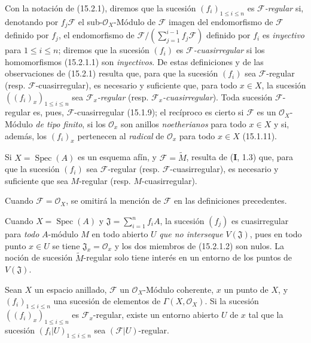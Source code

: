 \begin{env}[15.2.2]
\label{0.15.2.2-es}
Con la notación de (15.2.1), diremos que la sucesión
$(f_i)_{1\leq i\leq n}$ es \emph{$\mathscr{F}$-regular} si, denotando por
$f_j\mathscr{F}$ el sub-$\mathcal{O}_X$-Módulo de $\mathscr{F}$ imagen del
endomorfismo de $\mathscr{F}$ definido por $f_j$, el endomorfismo de
$\mathscr{F}/(\sum_{j=1}^{i-1}f_j\mathscr{F})$ definido por $f_i$ es \emph{inyectivo}
para $1\leq i\leq n$; diremos que la sucesión $(f_i)$ es
\emph{$\mathscr{F}$-cuasirregular} si los homomorfismos (15.2.1.1) son \emph{inyectivos}.
De estas definiciones y de las observaciones de (15.2.1) resulta que, para que
la sucesión $(f_i)$ sea $\mathscr{F}$-regular (resp.
$\mathscr{F}$-cuasirregular), es necesario y suficiente que, para todo
$x\in X$, la sucesión $((f_i)_x)_{1\leq i\leq n}$ sea
\emph{$\mathscr{F}_x$-regular} (resp. \emph{$\mathscr{F}_x$-cuasirregular}). Toda sucesión
$\mathscr{F}$-regular es, pues, $\mathscr{F}$-cuasirregular (15.1.9); el
recíproco es cierto si $\mathscr{F}$ es un $\mathcal{O}_X$-Módulo \emph{de tipo
finito}, si los $\mathcal{O}_x$ son anillos \emph{noetherianos} para todo $x\in X$ y
si, además, los $(f_i)_x$ pertenecen al \emph{radical} de $\mathcal{O}_x$ para todo
$x\in X$ (15.1.11).

Si $X=\operatorname{Spec}(A)$ es un esquema afín, y
$\mathscr{F}=\widetilde{M}$, resulta de (\textbf I, 1.3) que, para que la sucesión
$(f_i)$ sea $\mathscr{F}$-regular (resp. $\mathscr{F}$-cuasirregular), es
necesario y suficiente que sea $M$-regular (resp. $M$-cuasirregular).

Cuando $\mathscr{F}=\mathcal{O}_X$, se omitirá la mención de $\mathscr{F}$ en
las definiciones precedentes.
\end{env}

\begin{remark}[15.2.3]
\label{0.15.2.3-es}
Cuando $X=\operatorname{Spec}(A)$ y
$\mathfrak{J}=\sum_{i=1}^n f_iA$, la sucesión $(f_j)$ es cuasirregular para
\emph{todo} $A$-módulo $M$ en todo abierto $U$ \emph{que no interseque}
$V(\mathfrak{J})$, pues en todo punto $x\in U$ se tiene
$\mathfrak{J}_x=\mathcal{O}_x$ y los dos miembros de (15.2.1.2) son nulos. La
noción de sucesión $\widetilde{M}$-regular solo tiene interés en un entorno de
los puntos de $V(\mathfrak{J})$.
\end{remark}

\begin{proposition}[15.2.4]
\label{0.15.2.4-es}
Sean $X$ un espacio anillado, $\mathscr{F}$ un $\mathcal{O}_X$-Módulo
coherente, $x$ un punto de $X$, y $(f_i)_{1\leq i\leq n}$ una sucesión de
elementos de $\Gamma(X,\mathcal{O}_X)$. Si la sucesión
$((f_i)_x)_{1\leq i\leq n}$ es $\mathscr{F}_x$-regular, existe un entorno
abierto $U$ de $x$ tal que la sucesión $(f_i|U)_{1\leq i\leq n}$ sea
$(\mathscr{F}|U)$-regular.
\end{proposition}

